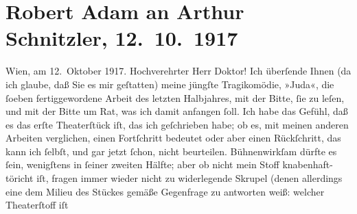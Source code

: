 

         \renewcommand{\erwaehnteInstitutionen}{Institutionen: Burgtheater, Nationaltheater München}
         \renewcommand{\erwaehnteOrte}{Orte: Wien}
         \renewcommand{\erwaehnteWerke}{Werke: Das Ende des Judas}
               \section[Robert Adam an Arthur Schnitzler, 12. 10. 1917]{ Robert Adam an Arthur Schnitzler, 12. 10. 1917}\nopagebreak{}\rehead{ }\begin{ledgroupsized}[t]{13cm}\normalsize\beginnumbering \toendnotes[C]{\smallbreak\pagebreak[2]} 
\pstart
           \raggedleft{}{\pb}Wien, am 12. Oktober
                  1917.\pend
           \pstart{}Hochverehrter Herr Doktor!\pend\pstart
           Ich überſende Ihnen (da ich glaube, daß Sie es mir geſtatten) meine jüngſte
               Tragikomödie, »Juda«, die ſoeben fertiggewordene
               Arbeit des letzten Halbjahres, mit der Bitte, ſie zu leſen, und mit der Bitte um Rat,
               was ich damit anfangen ſoll. Ich habe das Gefühl, daß es das erſte Theaterſtück iſt,
               das ich geſchrieben habe; ob es, mit meinen anderen Arbeiten verglichen, einen
               Fortſchritt bedeutet oder aber einen Rückſchritt, das kann ich ſelbſt, und gar jetzt
               ſchon, nicht beurteilen. Bühnenwirkſam dürfte es ſein, wenigſtens in ſeiner zweiten
               Hälfte; aber ob nicht mein Stoff {\pb}knabenhaft-töricht
               iſt, fragen immer wieder nicht zu widerlegende Skrupel (denen allerdings eine dem
               Milieu des Stückes gemäße Gegenfrage zu antworten weiß: welcher Theaterſtoff iſt

\end{ledgroupsized}
